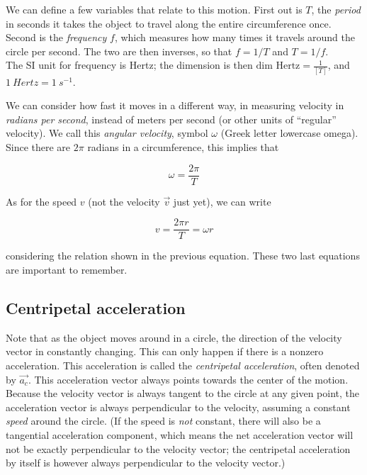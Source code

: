 \documentclass[8.01x]{subfiles}
\begin{document}
We can define a few variables that relate to this motion. First out is $T$, the \emph{period} in seconds it takes the object to travel along the entire circumference once. Second is the \emph{frequency} $f$, which measures how many times it travels around the circle per second. The two are then inverses, so that $f = 1/T$ and $T = 1/f$.\\
The SI unit for frequency is Hertz; the dimension is then $\text{dim Hertz} = \displaystyle \frac{1}{[T]}$, and $\SI{1}{Hertz} = \SI{1}{s^{-1}}$.

We can consider how fast it moves in a different way, in measuring velocity in \emph{radians per second}, instead of meters per second (or other units of ``regular'' velocity). We call this \emph{angular velocity}, symbol $\omega$ (Greek letter lowercase omega). Since there are $2\pi$ radians in a circumference, this implies that

\begin{equation}
\omega = \frac{2 \pi}{T}
\end{equation}

As for the speed $v$ (not the velocity $\vec{v}$ just yet), we can write

\begin{equation}
v = \frac{2 \pi r}{T} = \omega r
\end{equation}

considering the relation shown in the previous equation. These two last equations are important to remember.

\subsection{Centripetal acceleration}

Note that as the object moves around in a circle, the direction of the velocity vector in constantly changing. This can only happen if there is a nonzero acceleration. This acceleration is called the \emph{centripetal acceleration}, often denoted by $\vec{a_c}$. This acceleration vector always points towards the center of the motion. Because the velocity vector is always tangent to the circle at any given point, the acceleration vector is always perpendicular to the velocity, assuming a constant \emph{speed} around the circle. (If the speed is \emph{not} constant, there will also be a tangential acceleration component, which means the net acceleration vector will not be exactly perpendicular to the velocity vector; the centripetal acceleration by itself is however always perpendicular to the velocity vector.)
\end{document}
